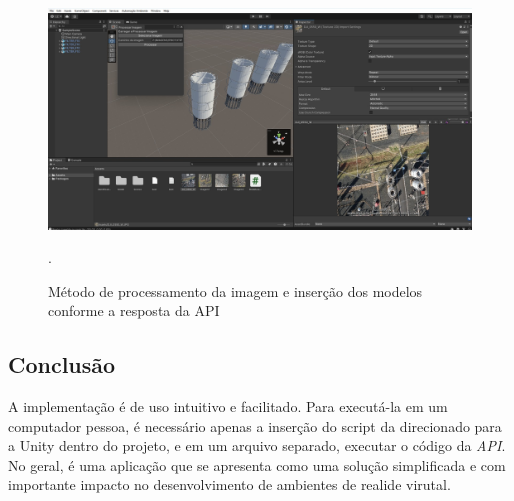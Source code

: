 \begin{figure}[!h]
    \centering
    \begin{minipage}{0.7\linewidth}
    \centering
    \captionsetup{justification=centering,margin=0.5cm,font=small}
    \includegraphics[width=1\linewidth]{img/cap5/predict.jpeg}
    \caption{Método de processamento da imagem e inserção dos modelos conforme a resposta da API}.
    \label{fig:predict}
    \end{minipage}
\end{figure}

\subsection{Conclusão}

A implementação é de uso intuitivo e facilitado. Para executá-la em um computador pessoa, é necessário apenas a inserção do script da direcionado para a Unity dentro do projeto, e em um arquivo separado, executar o código da \textit{API}. No geral, é uma aplicação que se apresenta como uma solução simplificada e com importante impacto no desenvolvimento de ambientes de realide virutal.


	
